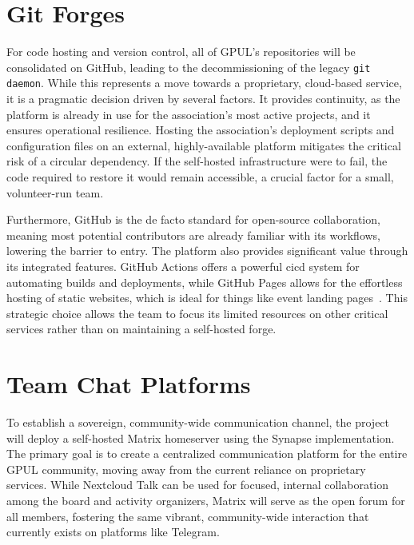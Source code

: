 \section{Git Forges}

For code hosting and version control, all of GPUL's repositories will be consolidated on GitHub, leading to the decommissioning of the legacy \texttt{git daemon}. While this represents a move towards a proprietary, cloud-based service, it is a pragmatic decision driven by several factors. It provides continuity, as the platform is already in use for the association's most active projects, and it ensures operational resilience. Hosting the association's deployment scripts and configuration files on an external, highly-available platform mitigates the critical risk of a circular dependency. If the self-hosted infrastructure were to fail, the code required to restore it would remain accessible, a crucial factor for a small, volunteer-run team.

Furthermore, GitHub is the de facto standard for open-source collaboration, meaning most potential contributors are already familiar with its workflows, lowering the barrier to entry. The platform also provides significant value through its integrated features. GitHub Actions offers a powerful \gls{cicd} system for automating builds and deployments, while GitHub Pages allows for the effortless hosting of static websites, which is ideal for things like event landing pages~\cite{github-docs}. This strategic choice allows the team to focus its limited resources on other critical services rather than on maintaining a self-hosted forge.

\section{Team Chat Platforms}

To establish a sovereign, community-wide communication channel, the project will deploy a self-hosted Matrix homeserver using the Synapse implementation. The primary goal is to create a centralized communication platform for the entire GPUL community, moving away from the current reliance on proprietary services. While Nextcloud Talk can be used for focused, internal collaboration among the board and activity organizers, Matrix will serve as the open forum for all members, fostering the same vibrant, community-wide interaction that currently exists on platforms like Telegram.

